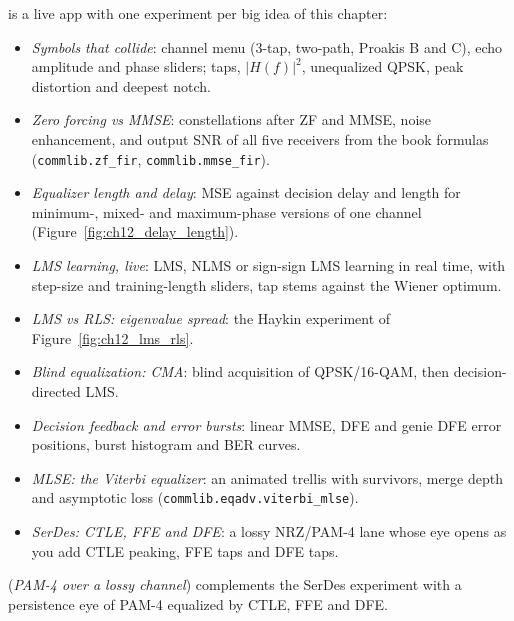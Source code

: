 \begin{labbox}
 is a live app with one experiment per big idea of
this chapter:
\begin{itemize}
\item \emph{Symbols that collide}: channel menu (3-tap, two-path, Proakis B and C), echo amplitude and
phase sliders; taps, $|H(f)|^2$, unequalized QPSK, peak distortion and deepest notch.
\item \emph{Zero forcing vs MMSE}: constellations after ZF and MMSE, noise enhancement, and output SNR of
all five receivers from the book formulas (\texttt{commlib.zf\_fir}, \texttt{commlib.mmse\_fir}).
\item \emph{Equalizer length and delay}: MSE against decision delay and length for minimum-, mixed- and
maximum-phase versions of one channel (Figure~\ref{fig:ch12_delay_length}).
\item \emph{LMS learning, live}: LMS, NLMS or sign-sign LMS learning in real time, with step-size and
training-length sliders, tap stems against the Wiener optimum.
\item \emph{LMS vs RLS: eigenvalue spread}: the Haykin experiment of Figure~\ref{fig:ch12_lms_rls}.
\item \emph{Blind equalization: CMA}: blind acquisition of QPSK/16-QAM, then decision-directed LMS.
\item \emph{Decision feedback and error bursts}: linear MMSE, DFE and genie DFE error positions, burst
histogram and BER curves.
\item \emph{MLSE: the Viterbi equalizer}: an animated trellis with survivors, merge depth and
asymptotic loss (\texttt{commlib.eqadv.viterbi\_mlse}).
\item \emph{SerDes: CTLE, FFE and DFE}: a lossy NRZ/PAM-4 lane whose eye opens as you add CTLE peaking,
FFE taps and DFE taps.
\end{itemize}
 (\emph{PAM-4 over a lossy channel}) complements
the SerDes experiment with a persistence eye of PAM-4 equalized by CTLE, FFE and DFE.
\end{labbox}

